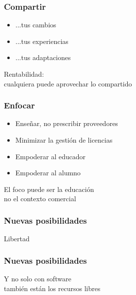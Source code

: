 \documentclass[17pt,aspectratio=169]{beamer}
\begin{document}

\begin{frame}
\frametitle{Compartir}

\begin{itemize}
\item ...tus cambios
\item ...tus experiencias
\item ...tus adaptaciones
\end{itemize}

\begin{flushright}
  Rentabilidad: \\
  cualquiera puede aprovechar lo compartido \\
\end{flushright}
\end{frame}


\begin{frame}
\frametitle{Enfocar}

\begin{itemize}
\item Enseñar, no prescribir proveedores
\item Minimizar la gestión de licencias
\item Empoderar al educador
\item Empoderar al alumno
\end{itemize}

\begin{flushright}
  El foco puede ser la educación \\
  no el contexto comercial \\
\end{flushright}
\end{frame}



\begin{frame}
\frametitle{Nuevas posibilidades}


{\Huge
\begin{center}
Libertad
\end{center}
}

\end{frame}


\begin{frame}
\frametitle{Nuevas posibilidades}


{\Large
\begin{center}
Y no solo con software \\
también están los recursos libres \\
\end{center}
}

\end{frame}
\end{document}
